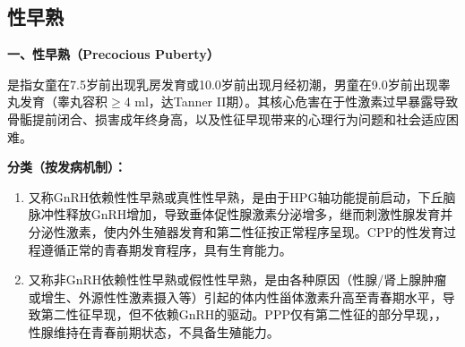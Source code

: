 \subsection{性早熟}

\begin{defbox}
\textbf{一、性早熟（Precocious Puberty）}

是指女童在7.5岁前出现乳房发育或10.0岁前出现月经初潮，男童在9.0岁前出现睾丸发育（睾丸容积$\geq$4 ml，达Tanner II期）。其核心危害在于性激素过早暴露导致骨骺提前闭合、损害成年终身高，以及性征早现带来的心理行为问题和社会适应困难。

\textbf{分类（按发病机制）：}
\begin{enumerate}[leftmargin=*]
    \item {}又称GnRH依赖性性早熟或真性性早熟，是由于HPG轴功能提前启动，下丘脑脉冲性释放GnRH增加，导致垂体促性腺激素分泌增多，继而刺激性腺发育并分泌性激素，使内外生殖器发育和第二性征按正常程序呈现。CPP的性发育过程遵循正常的青春期发育程序，具有生育能力。
    \item {}又称非GnRH依赖性性早熟或假性性早熟，是由各种原因（性腺/肾上腺肿瘤或增生、外源性性激素摄入等）引起的体内性甾体激素升高至青春期水平，导致第二性征早现，但不依赖GnRH的驱动。PPP仅有第二性征的部分早现，，性腺维持在青春前期状态，不具备生殖能力。
\end{enumerate}
\end{defbox}

